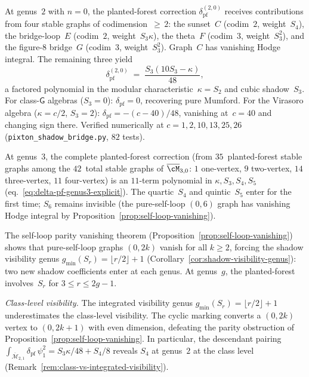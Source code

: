 \begin{remark}
\label{rem:pixton-genus2-computation}
At genus~$2$ with $n = 0$, the planted-forest correction
$\delta_{\mathrm{pf}}^{(2,0)}$ receives contributions from
four stable graphs of codimension~${\geq}\,2$:
the sunset~$C$ (codim~$2$, weight~$S_4$),
the bridge-loop~$E$ (codim~$2$, weight~$S_3\kappa$),
the theta~$F$ (codim~$3$, weight~$S_3^2$),
and the figure-$8$ bridge~$G$ (codim~$3$, weight~$S_3^2$).
Graph~$C$ has vanishing Hodge integral.
The remaining three yield
\begin{equation}\label{eq:planted-forest-genus2-polynomial}
\delta_{\mathrm{pf}}^{(2,0)}
\;=\;
\frac{S_3(10S_3 - \kappa)}{48},
\end{equation}
a factored polynomial in the modular characteristic~$\kappa = S_2$
and cubic shadow~$S_3$.
For class-$\mathsf{G}$ algebras ($S_3 = 0$):
$\delta_{\mathrm{pf}} = 0$, recovering pure Mumford.
For the Virasoro algebra ($\kappa = c/2$, $S_3 = 2$):
$\delta_{\mathrm{pf}} = -(c-40)/48$,
vanishing at~$c = 40$ and changing sign there.
Verified numerically at $c = 1, 2, 10, 13, 25, 26$
(\texttt{pixton\_shadow\_bridge.py}, $82$ tests).

At genus~$3$, the complete planted-forest correction (from
$35$~planted-forest stable graphs among the $42$~total stable graphs
of $\overline{\cM}_{3,0}$: $1$ one-vertex, $9$ two-vertex,
$14$ three-vertex, $11$ four-vertex)
is an $11$-term polynomial in $\kappa, S_3, S_4, S_5$
(eq.~\eqref{eq:delta-pf-genus3-explicit}).
The quartic~$S_4$ and quintic~$S_5$ enter for the first time;
$S_6$ remains invisible (the pure-self-loop $(0,6)$ graph has
vanishing Hodge integral by
Proposition~\ref{prop:self-loop-vanishing}).

The self-loop parity vanishing theorem
(Proposition~\ref{prop:self-loop-vanishing}) shows that
pure-self-loop graphs $(0,2k)$ vanish for all $k \geq 2$,
forcing the shadow visibility genus
$g_{\min}(S_r) = \lfloor r/2 \rfloor + 1$
(Corollary~\ref{cor:shadow-visibility-genus}):
two new shadow coefficients enter at each genus.
At genus~$g$, the planted-forest involves~$S_r$
for $3 \leq r \leq 2g{-}1$.

\emph{Class-level visibility.}
The integrated visibility genus
$g_{\min}(S_r) = \lfloor r/2 \rfloor + 1$
underestimates the class-level visibility.
The cyclic marking converts a $(0,2k)$ vertex to
$(0,2k{+}1)$ with even dimension, defeating
the parity obstruction of
Proposition~\ref{prop:self-loop-vanishing}.
In particular, the descendant pairing
$\int_{\overline{\mathcal{M}}_{2,1}}
\delta_{\mathrm{pf}}\,\psi_1^2
= S_3\kappa/48 + S_4/8$
reveals $S_4$ at genus~$2$ at the class level
(Remark~\ref{rem:class-vs-integrated-visibility}).


\end{remark}
